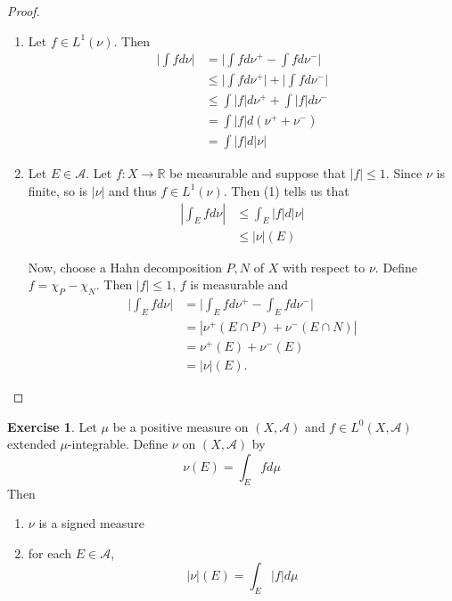 \documentclass[12pt]{amsart}
\theoremstyle{definition}
\newtheorem{ex}[definition]{Exercise}
\newcommand{\R}{\mathbb{R}}
\newcommand{\MA}{\mathcal{A}}
\newcommand{\lex}[1]{\label{ex:#1}}
\begin{document}
	\begin{proof}
		\begin{enumerate}
			\item Let $f \in L^1(\nu)$. Then 
			\begin{align*}
				\bigg|\int f d \nu \bigg| 
				&= \bigg|\int f d \nu^+ - \int f d \nu^-\bigg|\\
				& \leq \bigg|\int f d \nu^+\bigg| + \bigg|\int f d \nu^-\bigg|\\
				& \leq \int |f| d\nu^+ + \int |f| d\nu^-\\
				&= \int |f| d (\nu^+ + \nu^-)\\
				&= \int |f| d |\nu|
			\end{align*}
			
			\item Let $E \in \MA$. Let $f:X \rightarrow \R$ be measurable and suppose that $|f| \leq 1$. Since $\nu$ is finite, so is $|\nu|$ and thus $f \in L^1(\nu)$. Then (1) tells us that 
			\begin{align*}
				|\int_E f d \nu| 
				& \leq \int_E |f| d |\nu|\\
				& \leq |\nu|(E) 
			\end{align*}
			
			Now, choose a Hahn decomposition $P,N$ of $X$ with respect to $\nu$. Define $f = \chi_{P} - \chi_{N}$. Then $|f| \leq 1$, $f$ is measurable and 
			\begin{align*}
				\bigg|\int_E f d\nu\bigg|
				&= \bigg|\int_E f d \nu^+ - \int_E f d \nu^-\bigg|\\
				&= | \nu^+(E \cap P) + \nu^-(E \cap N)|\\
				&= \nu^+(E) + \nu^-(E)\\
				&= |\nu|(E).
			\end{align*}
			
		\end{enumerate}
	\end{proof}
	
	\begin{ex} \lex{00000} 
		Let $\mu$ be a positive measure on $(X, \MA)$ and $f \in L^0(X, \MA)$ extended $\mu$-integrable. Define $\nu$ on $(X, \MA)$ by $$\nu(E) = \int_E f d \mu$$ Then
		\begin{enumerate}
			\item $\nu$ is a signed measure
			\item for each $E\in \MA$, $$|\nu|(E) = \int_E|f|d\mu$$
		\end{enumerate} 
	\end{ex}
	
\end{document}
